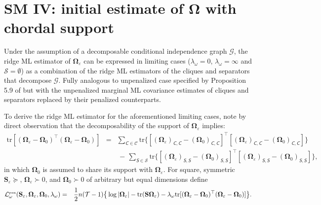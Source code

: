 \documentclass[a4paper]{article}
\begin{document}
\newpage
\section*{SM IV: initial estimate of $\mathbf{\Omega}$ with chordal support}
Under the assumption of a decomposable conditional independence graph $\mathcal{G}$, the ridge ML estimator of $\mathbf{\Omega}_{\varepsilon}$ can be expressed in limiting cases ($\lambda_{\omega}=0$, $\lambda_{\omega}=\infty$ and $\mathcal{S} = \emptyset$) as a combination of the ridge ML estimators of the cliques and separators that decompose $\mathcal{G}$. Fully analogous to unpenalized case specified by Proposition 5.9 of \cite{Laur1996} but with the unpenalized marginal ML covariance estimates of cliques and separators replaced by their penalized counterparts.

To derive the ridge ML estimator for the aforementioned limiting cases, note by direct observation that the decomposability of the support of $\mathbf{\Omega}_{\varepsilon}$ implies:
\begin{eqnarray}
\nonumber
\mbox{tr}  [ (\mathbf{\Omega}_{\varepsilon} - \mathbf{\Omega}_0)^\top (\mathbf{\Omega}_{\varepsilon} - \mathbf{\Omega}_0)]
& = & \sum_{\mathsfit{C} \in \mathcal{C}} \mbox{tr} \{ [ (\mathbf{\Omega}_{\varepsilon})_{\mathsfit{C},\mathsfit{C}} - (\mathbf{\Omega}_0)_{\mathsfit{C}, \mathsfit{C}} ]^{\top} [(\mathbf{\Omega}_{\varepsilon})_{\mathsfit{C},\mathsfit{C}} - (\mathbf{\Omega}_0)_{\mathsfit{C}, \mathsfit{C}}] \}
\\
\label{form.reformulatedRidgePanelty}
& &  \, - \, \sum_{\mathsfit{S} \in \mathcal{S}} \mbox{tr} \{ [ (\mathbf{\Omega}_{\varepsilon})_{\mathsfit{S},\mathsfit{S}} - (\mathbf{\Omega}_0)_{\mathsfit{S}, \mathsfit{S}} ]^{\top} [(\mathbf{\Omega}_{\varepsilon})_{\mathsfit{S}, \mathsfit{S}} - (\mathbf{\Omega}_0)_{\mathsfit{S}, \mathsfit{S}}] \},
\end{eqnarray}
in which $\mathbf{\Omega}_0$ is assumed to share its support with $\mathbf{\Omega}_{\varepsilon}$. For square, symmetric $\mathbf{S}_{\varepsilon} \succeq$, $\mathbf{\Omega}_{\varepsilon} \succ 0$, and $\mathbf{\Omega}_0 \succ 0$ of arbitrary but equal dimensions define
\begin{eqnarray*}
\mathcal{L}_{\omega}^{\mbox{{\tiny pen}}}(\mathbf{S}_{\varepsilon}, \mathbf{\Omega}_{\varepsilon}, \mathbf{\Omega}_0, \lambda_{\omega}) & = & \frac{1}{2} n (\mathcal{T} - 1) \big\{ \log| \mathbf{\Omega}_{\varepsilon} |   - \mbox{tr}  ( \mathbf{S}  \mathbf{\Omega}_{\varepsilon} ) - \lambda_{\omega} \mbox{tr}  [ (\mathbf{\Omega}_{\varepsilon} -\mathbf{\Omega}_0)^{\top} (\mathbf{\Omega}_{\varepsilon} - \mathbf{\Omega}_0) ] \big\}.
\end{eqnarray*}
\end{document}
